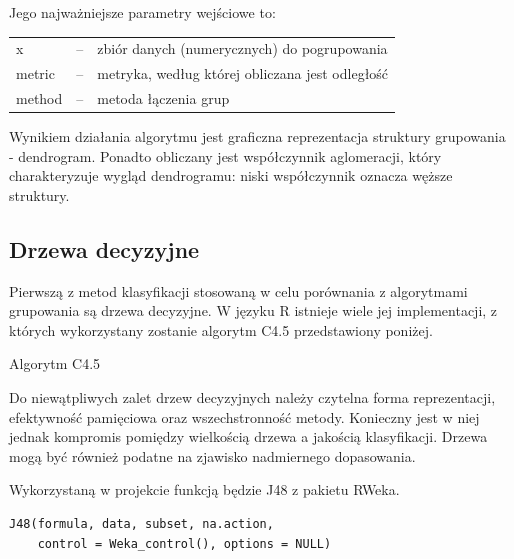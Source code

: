 \documentclass[11pt,a4paper,twoside]{article}
\begin{document}
Jego najważniejsze parametry wejściowe to:

\begin{table}[ht]
\label{agnes_params}
\centering
\begin{tabularx}{\textwidth}{lcX}
 x & -- & zbiór danych (numerycznych) do pogrupowania \\
metric & -- & metryka, według której obliczana jest odległość \\
method & -- & metoda łączenia grup\\
\end{tabularx}
\end{table}

Wynikiem działania algorytmu jest graficzna reprezentacja struktury grupowania - dendrogram. Ponadto obliczany jest współczynnik aglomeracji, który charakteryzuje wygląd dendrogramu: niski współczynnik oznacza węższe struktury.

\subsection{Drzewa decyzyjne}

Pierwszą z metod klasyfikacji stosowaną w celu porównania z algorytmami grupowania są drzewa decyzyjne. W języku R istnieje wiele jej implementacji, z których wykorzystany zostanie algorytm C4.5 przedstawiony poniżej.

\begin{algorithm}[ht]
\caption{Algorytm C4.5}
\label{decision_tree}
	\begin{algorithmic}
	\end{algorithmic}
\end{algorithm}

Do niewątpliwych zalet drzew decyzyjnych należy czytelna forma reprezentacji, efektywność pamięciowa oraz wszechstronność metody. Konieczny jest w niej jednak kompromis pomiędzy wielkością drzewa a jakością klasyfikacji. Drzewa mogą być również podatne na zjawisko nadmiernego dopasowania.

Wykorzystaną w projekcie funkcją będzie J48 z pakietu RWeka.

\begin{verbatim}
J48(formula, data, subset, na.action,
    control = Weka_control(), options = NULL)
\end{verbatim} 
\end{document}
